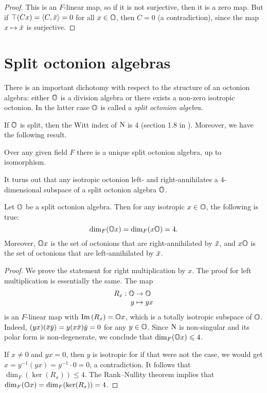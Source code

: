 \begin{proof}
	This is an $F$-linear map, so if it is not surjective, then it is a zero map. But if 
	$\top(Cx) = \langle C, \mathord{\mbox{\hspace*{0pt}}\,\overline{\!x\!\!\;}\!\:}\mbox{\hspace*{0pt}} \rangle = 0$ for all $x \in \mathbb{O}$, then $C = 0$ (a contradiction), since the
	map $x \mapsto \mathord{\mbox{\hspace*{0pt}}\,\overline{\!x\!\!\;}\!\:}\mbox{\hspace*{0pt}}$ is surjective. 
\end{proof}

\section{Split octonion algebras}

There is an important dichotomy with respect to the structure of an octonion algebra: 
either $\mathbb{O}$ is a division algebra or there exists a non-zero isotropic octonion.
In the latter case $\mathbb{O}$ is called a \textit{split octonion algebra}. 

If $\mathbb{O}$ is split, then the Witt index of $\mathord{\mathrm{N}}$ is $4$ (section 1.8 in \cite{SpringerVeldkamp}).
Moreover, we have the following result.
\begin{theorem}
	\label{theorem:unique_split_algebra}
	Over any given field $F$ there is a unique split octonion algebra, up to isomorphism.
\end{theorem}
It turns out that any isotropic octonion left- and right-annihilates a $4$-dimensional subspace
of a split octonion algebra $\mathbb{O}$. 

\begin{proposition}
	\label{prop:octonion_annihilator}
	Let $\mathbb{O}$ be a split octonion algebra. Then for any isotropic $x \in \mathbb{O}$, the 
	following is true:
	\begin{equation}
		\dim_F(\mathbb{O} x) = \dim_F(x\mathbb{O}) = 4. 
	\end{equation}
	Moreover, $\mathbb{O} x$ is the set of octonions that are right-annihilated by $\mathord{\mbox{\hspace*{0pt}}\,\overline{\!x\!\!\;}\!\:}\mbox{\hspace*{0pt}}$, and
	$x \mathbb{O}$ is the set of octonions that are left-annihilated by $\mathord{\mbox{\hspace*{0pt}}\,\overline{\!x\!\!\;}\!\:}\mbox{\hspace*{0pt}}$.
\end{proposition}

\begin{proof}
	We prove the statement for right multiplication by $x$. The proof
	for left multiplication is essentially the same. The map
	\begin{equation*}
		\begin{array}{r@{\;}c@{\;}l}
			R_x : \O & \rightarrow & \O \\
			y & \mapsto & yx
		\end{array}
	\end{equation*}
	is an $F$-linear map with $\mathrm{Im}\,(R_x) = \mathbb{O} x$, which is a totally isotropic
	subspace of $\mathbb{O}$. Indeed, $(yx)(\ovx \ovy) = y(x\ovx)\ovy = 0$ for any
	$y \in \mathbb{O}$. Since $\mathord{\mathrm{N}}$ is non-singular and its polar form is non-degenerate,
	we conclude that $\dim_F(\mathbb{O} x) \leqslant 4$.
	
	If $x \neq 0$ and $yx = 0$, then $y$ is isotropic for if that were not 
	the case, we would get $x = y^{-1}(yx) = y^{-1}\cdot 0 = 0$,
	a contradiction. It follows that \mbox{$\dim_F(\ker(R_x)) \leqslant 4$}.
	The Rank--Nullity theorem implies that \mbox{$\dim_F(\mathbb{O} x) = \dim_F(\operatorname{ker}(R_x)) = 4$}. 
\end{proof}

